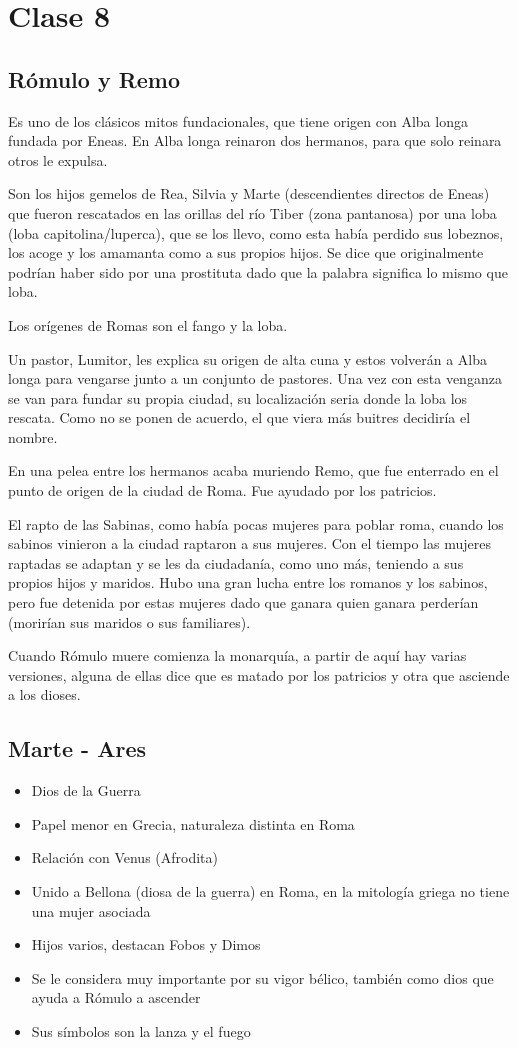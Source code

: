 \chapter{Clase 8}\label{ch:clase8}
\section{Rómulo y Remo}
Es uno de los clásicos mitos fundacionales, que tiene origen con Alba longa fundada por Eneas. En Alba longa reinaron dos hermanos, para que solo reinara otros le expulsa.

Son los hijos gemelos de Rea, Silvia y Marte (descendientes directos de Eneas) que fueron rescatados en las orillas del río Tiber (zona pantanosa) por una loba (loba capitolina/luperca), que se los llevo, como esta había perdido sus lobeznos, los acoge y los amamanta como a sus propios hijos. Se dice que originalmente podrían haber sido por una prostituta dado que la palabra significa lo mismo que loba.

Los orígenes de Romas son el fango y la loba.

Un pastor, Lumitor, les explica su origen de alta cuna y estos volverán a Alba longa para vengarse junto a un conjunto de pastores. Una vez con esta venganza se van para fundar su propia ciudad, su localización seria donde la loba los rescata. Como no se ponen de acuerdo, el que viera más buitres decidiría el nombre.

En una pelea entre los hermanos acaba muriendo Remo, que fue enterrado en el punto de origen de la ciudad de Roma. Fue ayudado por los patricios.

El rapto de las Sabinas, como había pocas mujeres para poblar roma, cuando los sabinos vinieron a la ciudad raptaron a sus mujeres. Con el tiempo las mujeres raptadas se adaptan y se les da ciudadanía, como uno más, teniendo a sus propios hijos y maridos. Hubo una gran lucha entre los romanos y los sabinos, pero fue detenida por estas mujeres dado que ganara quien ganara perderían (morirían sus maridos o sus familiares).

Cuando Rómulo muere comienza la monarquía, a partir de aquí hay varias versiones, alguna de ellas dice que es matado por los patricios y otra que asciende a los dioses.

\section{Marte - Ares}
\begin{itemize}
	\item Dios de la Guerra
	\item Papel menor en Grecia, naturaleza distinta en Roma
	\item Relación con Venus (Afrodita)
	\item Unido a Bellona (diosa de la guerra) en Roma, en la mitología griega no tiene una mujer asociada
	\item Hijos varios, destacan Fobos y Dimos
	\item Se le considera muy importante por su vigor bélico, también como dios que ayuda a Rómulo a ascender
	\item Sus símbolos son la lanza y el fuego
\end{itemize}

